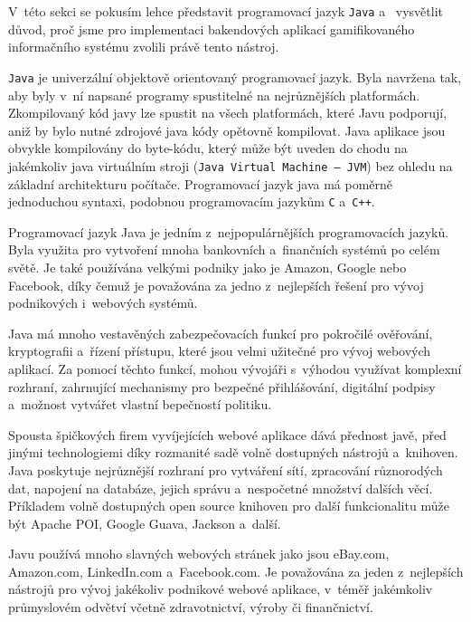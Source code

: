 \documentclass[twoside, 12pt]{article}
\begin{document}
{
V~této sekci se pokusím lehce představit programovací jazyk \texttt{Java} a~
vysvětlit důvod, proč jsme pro implementaci bakendových aplikací
gamifikovaného informačního systému zvolili právě tento nástroj.

\texttt{Java} je univerzální objektově orientovaný programovací jazyk.
Byla navržena tak, aby byly v~ní napsané programy spustitelné na nejrůznějších platformách.
Zkompilovaný kód javy lze spustit na všech platformách, které Javu podporují,
aniž by bylo nutné zdrojové java kódy opětovně kompilovat.
Java aplikace jsou obvykle kompilovány do byte-kódu,
který může být uveden do chodu na jakémkoliv java virtuálním stroji
(\texttt{Java Virtual Machine -- JVM}) bez ohledu na základní architekturu počítače.
Programovací jazyk java má poměrně jednoduchou syntaxi,
podobnou programovacím jazykům \texttt{C} a~\texttt{C++}.
\cite{oracleJava}


Programovací jazyk Java je jedním z~nejpopulárnějších programovacích jazyků.
Byla využita pro vytvoření mnoha bankovních a~finančních systémů po celém světě.
Je také používána velkými podniky jako je Amazon, Google nebo Facebook,
díky čemuž je považována za jedno z~nejlepších řešení pro vývoj podnikových i~webových systémů.

Java má mnoho vestavěných zabezpečovacích funkcí pro pokročilé ověřování,
kryptografii a~řízení přístupu, které jsou velmi užitečné pro vývoj webových aplikací.
Za pomocí těchto funkcí, mohou vývojáři s~výhodou využívat komplexní
rozhraní, zahrnující mechanismy pro bezpečné přihlášování, digitální podpisy a~možnost vytvářet vlastní bepečností politiku.

Spousta špičkových firem vyvíjejících webové aplikace dává přednost javě,
před jinými technologiemi díky rozmanité sadě volně dostupných nástrojů a~knihoven.
Java poskytuje nejrůznější rozhraní pro vytváření sítí, zpracování různorodých dat,
napojení na databáze, jejich správu a~nespočetné množství dalších věcí.
Příkladem volně dostupných open source knihoven pro další funkcionalitu může být
Apache POI, Google Guava, Jackson a~další.

Javu používá mnoho slavných webových stránek jako jsou
eBay.com, Amazon.com, LinkedIn.com a~Facebook.com.
Je považována za jeden z~nejlepších nástrojů
pro vývoj jakékoliv podnikové webové aplikace, v~téměř
jakémkoliv průmyslovém odvětví včetně zdravotnictví, výroby či finančnictví.

}
\end{document}

